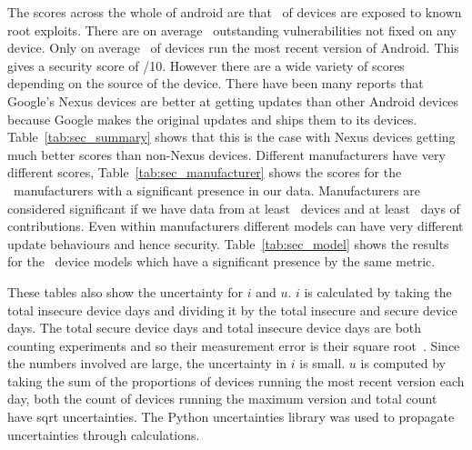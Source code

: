 The scores across the whole of android are that \daMeanInsecurityPerc\ of devices are exposed to known root exploits.
There are on average \daMeanOutstandingVulnerabilities\ outstanding vulnerabilities not fixed on any device.
Only on average \daUpdatednessPerc\ of devices run the most recent version of Android.
This gives a security score of \daSecurityScore/10.
\daTabSecScoressummary
However there are a wide variety of scores depending on the source of the device.
There have been many reports that Google's Nexus devices are better at getting updates than other Android devices because Google makes the original updates and ships them to its devices.
Table~\ref{tab:sec_summary} shows that this is the case with Nexus devices getting much better scores than non-Nexus devices.
\daTabSecScoresmanufacturer
Different manufacturers have very different scores, Table~\ref{tab:sec_manufacturer} shows the scores for the \daNumSigManufacturers\ manufacturers with a significant presence in our data.
Manufacturers are considered significant if we have data from at least \daSigNumDevices\ devices and at least \daSigNumDeviceDays\ days of contributions.
\daTabSecScoresmodel
Even within manufacturers different models can have very different update behaviours and hence security.
Table~\ref{tab:sec_model} shows the results for the \daNumSigModels\ device models which have a significant presence by the same metric.

These tables also show the uncertainty for $i$ and $u$.
$i$ is calculated by taking the total insecure device days and dividing it by the total insecure and secure device days.
The total secure device days and total insecure device days are both counting experiments and so their measurement error is their square root~\cite{Taylor1997}.
Since the numbers involved are large, the uncertainty in $i$ is small.
$u$ is computed by taking the sum of the proportions of devices running the most recent version each day, both the count of devices running the maximum version and total count have sqrt uncertainties.
The Python uncertainties library was used to propagate uncertainties through calculations.

